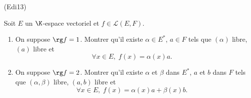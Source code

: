 \begin{tiny}(Edi13)\end{tiny} Soit $E$ un $\K$-espace vectoriel et $f\in \mathcal{L}(E,F)$.
\begin{enumerate}
 \item On suppose $\rg f = 1$. Montrer qu'il existe $\alpha \in E^*$, $a\in F$ tels que $(\alpha)$ libre, $(a)$ libre et 
\[
 \forall x \in E, \; f(x) = \alpha(x) a.
\]
 \item On suppose $\rg f = 2$. Montrer qu'il existe $\alpha$ et $\beta$ dans $E^*$, $a$ et $b$ dans $F$ tels que $(\alpha, \beta)$ libre, $(a,b)$ libre et 
\[
 \forall x \in E, \; f(x) = \alpha(x) a + \beta(x) b.
\]
\end{enumerate}

